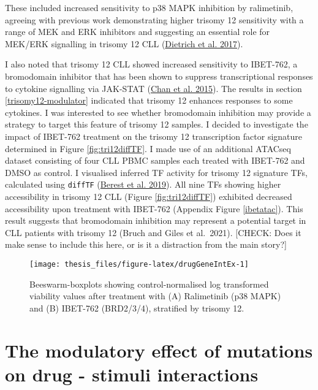 \documentclass[11pt, a4paper, twosided]{book}
\begin{document}
These included increased sensitivity to p38 MAPK inhibition by ralimetinib, agreeing with previous work demonstrating higher trisomy 12 sensitivity with a range of MEK and ERK inhibitors and suggesting an essential role for MEK/ERK signalling in trisomy 12 CLL (\protect\hyperlink{ref-JCIpaper}{Dietrich et al. 2017}).

I also noted that trisomy 12 CLL showed increased sensitivity to IBET-762, a bromodomain inhibitor that has been shown to suppress transcriptional responses to cytokine signalling via JAK-STAT (\protect\hyperlink{ref-Chan2015}{Chan et al. 2015}). The results in section \ref{trisomy12-modulator} indicated that trisomy 12 enhances responses to some cytokines. I was interested to see whether bromodomain inhibition may provide a strategy to target this feature of trisomy 12 samples. I decided to investigate the impact of IBET-762 treatment on the trisomy 12 transcription factor signature determined in Figure \ref{fig:tri12diffTF}. I made use of an additional ATACseq dataset consisting of four CLL PBMC samples each treated with IBET-762 and DMSO as control. I visualised inferred TF activity for trisomy 12 signature TFs, calculated using \texttt{diffTF} (\protect\hyperlink{ref-Berest2019}{Berest et al. 2019}). All nine TFs showing higher accessibility in trisomy 12 CLL (Figure \ref{fig:tri12diffTF}) exhibited decreased accessibility upon treatment with IBET-762 (Appendix Figure \ref{ibetatac}). This result suggests that bromodomain inhibition may represent a potential target in CLL patients with trisomy 12 (Bruch and Giles et al.~2021). {[}CHECK: Does it make sense to include this here, or is it a distraction from the main story?{]}


\begin{figure}

{\centering \texttt{[image: thesis\_files/figure-latex/drugGeneIntEx-1]} 

}

\caption{Beeswarm-boxplots showing control-normalised log transformed viability values after treatment with (A) Ralimetinib (p38 MAPK) and (B) IBET-762 (BRD2/3/4), stratified by trisomy 12.}\label{fig:drugGeneIntEx}
\end{figure}
\hypertarget{drug-stimulus-gene-interactions}{%
\section{The modulatory effect of mutations on drug - stimuli interactions}\label{drug-stimulus-gene-interactions}}
\end{document}

